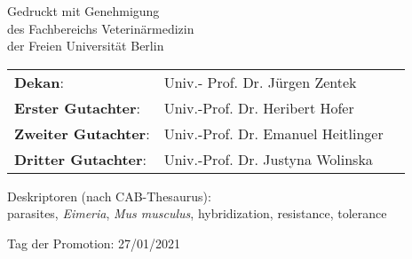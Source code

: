 \begin{center}
\thispagestyle{empty} %

Gedruckt mit Genehmigung \\
des Fachbereichs Veterinärmedizin \\
der Freien Universität Berlin
\end{center}

\vspace{2cm}

\begin{tabular}{ l l l } 
\textbf{Dekan}: & Univ.- Prof. Dr. J\"urgen Zentek \\
\textbf{Erster Gutachter}: & Univ.-Prof. Dr. Heribert Hofer \\
\textbf{Zweiter Gutachter}: & Univ.-Prof. Dr. Emanuel Heitlinger \\
\textbf{Dritter Gutachter}: & Univ.-Prof. Dr. Justyna Wolinska \\
\end{tabular}

\vspace{2cm}

Deskriptoren (nach CAB-Thesaurus):\\
parasites, \textit{Eimeria}, \textit{Mus musculus}, hybridization, resistance, tolerance

\vspace{2cm}

Tag der Promotion: 27/01/2021
